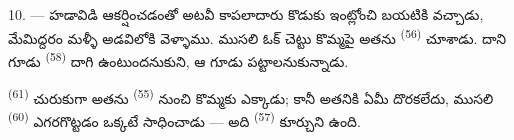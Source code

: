10. ---  హడావిడి ఆకర్షించడంతో అటవీ కాపలాదారు కొడుకు ఇంట్లోంచి బయటికి
వచ్చాడు, మేమిద్దరం మళ్ళీ అడవిలోకి వెళ్ళాము. ముసలి ఓక్ చెట్టు కొమ్మపై అతను
 \textsuperscript{(56)} చూశాడు. దాని గూడు 
\textsuperscript{(58)} దాగి ఉంటుందనుకుని, ఆ గూడు పట్టాలనుకున్నాడు.

 \textsuperscript{(61)} చురుకుగా అతను  \textsuperscript{(55)}
నుంచి కొమ్మకు ఎక్కాడు; కానీ అతనికి ఏమీ దొరకలేదు, ముసలి 
\textsuperscript{(60)} ఎగరగొట్టడం ఒక్కటే సాధించాడు — అది 
\textsuperscript{(57)} కూర్చుని ఉంది.

\VUsaut{6.0mm}
\VUfilet{22mm}
